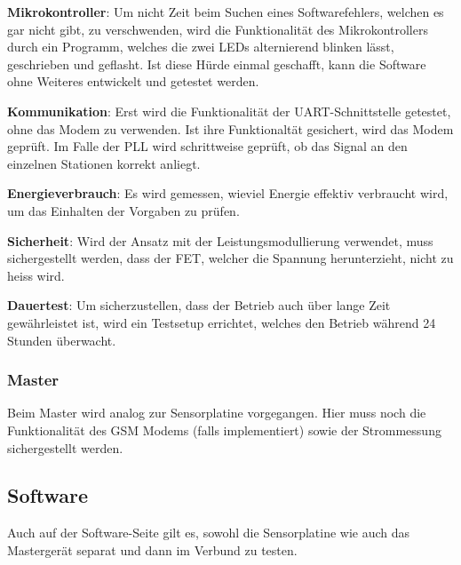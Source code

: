 \textbf{Mikrokontroller}: Um  nicht Zeit  beim  Suchen eines  Softwarefehlers,
welchen  es gar  nicht gibt,  zu verschwenden,  wird die  Funktionalit\"at des
Mikrokontrollers  durch  ein  Programm,  welches die  zwei  LEDs  alternierend
blinken l\"asst, geschrieben und geflasht. Ist diese H\"urde einmal geschafft,
kann die Software ohne Weiteres entwickelt und getestet werden.

\textbf{Kommunikation}: Erst wird die  Funktionalit\"at der UART-Schnittstelle
getestet,  ohne das  Modem zu  verwenden. Ist ihre  Funktionalt\"at gesichert,
wird das Modem gepr\"uft. Im Falle der PLL wird schrittweise gepr\"uft, ob das
Signal an den einzelnen Stationen korrekt anliegt.

\textbf{Energieverbrauch}: Es   wird   gemessen,  wieviel   Energie   effektiv
verbraucht wird, um das Einhalten der Vorgaben zu pr\"ufen.

\textbf{Sicherheit}: Wird der Ansatz  mit der Leistungsmodullierung verwendet,
muss sichergestellt werden, dass der  FET, welcher die Spannung herunterzieht,
nicht zu heiss wird.

\textbf{Dauertest}: Um  sicherzustellen, dass  der Betrieb  auch \"uber  lange
Zeit gew\"ahrleistet  ist, wird ein  Testsetup errichtet, welches  den Betrieb
w\"ahrend 24 Stunden \"uberwacht.


\subsubsection{Master}

Beim  Master wird  analog zur  Sensorplatine vorgegangen. Hier  muss noch  die
Funktionalit\"at des  GSM Modems (falls implementiert)  sowie der Strommessung
sichergestellt werden.


\subsection{Software}

Auch auf  der Software-Seite gilt  es, sowohl  die Sensorplatine wie  auch das
Masterger\"at separat und dann im Verbund zu testen.


